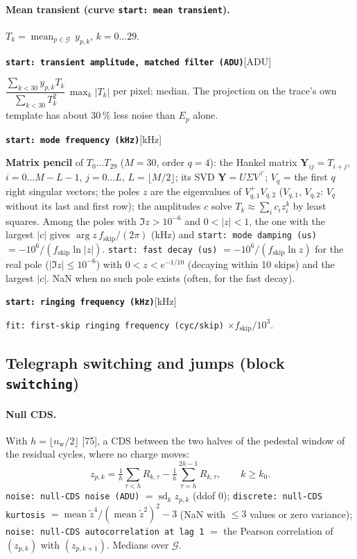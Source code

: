 \documentclass[10pt]{article}
\newcommand{\code}[1]{\texttt{#1}}
\newcommand{\feat}[2]{\par\medskip\noindent\textbf{\texttt{#1}}\hfill{\small [#2]}\par\nopagebreak\smallskip}
\newcommand{\mean}{\operatorname*{mean}}
\newcommand{\std}{\operatorname{sd}}
\newcommand{\nw}{n_\text{w}}
\newcommand{\ko}{k_0}
\newcommand{\G}{\mathcal G}
\begin{document}
\paragraph{Mean transient (curve \code{start: mean transient}).} $T_k = \mean_{p\in\G}\, y_{p,k}$, $k = 0 \dots 29$.
\feat{start: transient amplitude, matched filter (ADU)}{ADU}
$\dfrac{\sum_{k<30} y_{p,k}T_k}{\sum_{k<30}T_k^2}\,\max_k|T_k|$ per pixel; median. The projection on the trace's own template has about
30\,\% less noise than $E_p$ alone.
\feat{start: mode frequency (kHz)}{kHz}
\textbf{Matrix pencil} of $T_0 \dots T_{29}$ ($M = 30$, order $q = 4$): the Hankel matrix $\mathbf Y_{ij} = T_{i+j}$,
$i = 0 \dots M - L - 1$, $j = 0 \dots L$, $L = \lfloor M/2\rfloor$; its SVD $\mathbf Y = U\Sigma V^\top$; $V_q$ = the first $q$ right
singular vectors; the poles $z$ are the eigenvalues of $V_{q,1}^+ V_{q,2}$ ($V_{q,1}$, $V_{q,2}$: $V_q$ without its last and first row);
the amplitudes $c$ solve $T_k \approx \sum_i c_i z_i^k$ by least squares. Among the poles with $\Im z > 10^{-6}$ and $0 < |z| < 1$, the one
with the largest $|c|$ gives $\arg z\, f_\text{skip}/(2\pi)$ (kHz) and \code{start: mode damping (us)} $= -10^6/(f_\text{skip}\ln|z|)$.
\code{start: fast decay (us)} $= -10^6/(f_\text{skip}\ln z)$ for the real pole ($|\Im z| \le 10^{-6}$) with $0 < z < e^{-1/10}$ (decaying within
10 skips) and the largest $|c|$. NaN when no such pole exists (often, for the fast decay).
\feat{start: ringing frequency (kHz)}{kHz}
\code{fit: first-skip ringing frequency (cyc/skip)} $\times f_\text{skip}/10^3$.

\subsection{Telegraph switching and jumps (block \code{switching})}

\paragraph{Null CDS.} With $h = \lfloor\nw/2\rfloor$ [75], a CDS between the two halves of the pedestal window of the residual cycles, where
no charge moves:
\begin{equation}
z_{p,k} = \tfrac1h\sum_{\tau<h}R_{k,\tau} - \tfrac1h\sum_{\tau=h}^{2h-1}R_{k,\tau},\qquad k \ge \ko .
\end{equation}
\code{noise: null-CDS noise (ADU)} $= \std_k z_{p,k}$ (ddof 0); \code{discrete: null-CDS kurtosis} $= \mean\tilde z^4/(\mean \tilde z^2)^2 - 3$
(NaN with $\le 3$ values or zero variance); \code{noise: null-CDS autocorrelation at lag 1} $=$ the Pearson correlation of
$(z_{p,k})$ with $(z_{p,k+1})$. Medians over $\G$.
\end{document}

